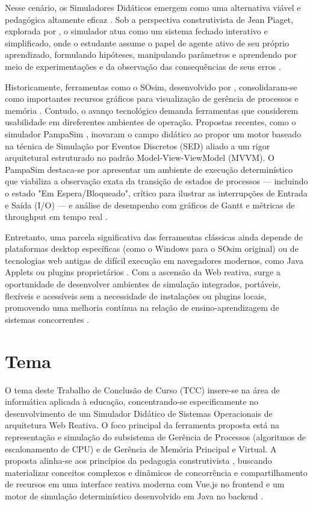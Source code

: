 Nesse cenário, os Simuladores Didáticos emergem como uma alternativa viável e pedagógica altamente eficaz \cite{maziero2002reflexoes}. Sob a perspectiva construtivista de Jean Piaget, explorada por , o simulador atua como um sistema fechado interativo e simplificado, onde o estudante assume o papel de agente ativo de seu próprio aprendizado, formulando hipóteses, manipulando parâmetros e aprendendo por meio de experimentações e da observação das consequências de seus erros \cite{teixeira2001siso, maia2005constructivist}. 

Historicamente, ferramentas como o SOsim, desenvolvido por , consolidaram-se como importantes recursos gráficos para visualização de gerência de processos e memória \cite{scamati2017esorv}. Contudo, o avanço tecnológico demanda ferramentas que considerem usabilidade em direferentes ambientes de operação. Propostas recentes, como o simulador PampaSim \cite{dutra2026pampasim}, inovaram o campo didático ao propor um motor baseado na técnica de Simulação por Eventos Discretos (SED) aliado a um rigor arquitetural estruturado no padrão Model-View-ViewModel (MVVM). O PampaSim destaca-se por apresentar um ambiente de execução determinístico que viabiliza a observação exata da transição de estados de processos --- incluindo o estado "Em Espera/Bloqueado", crítico para ilustrar as interrupções de Entrada e Saída (I/O) --- e análise de desempenho com gráficos de Gantt e métricas de throughput em tempo real \cite{dutra2026pampasim}.

Entretanto, uma parcela significativa das ferramentas clássicas ainda depende de plataformas desktop específicas (como o Windows para o SOsim original) ou de tecnologias web antigas de difícil execução em navegadores modernos, como Java Applets ou plugins proprietários \cite{reis2009tbcso}. Com a ascensão da Web reativa, surge a oportunidade de desenvolver ambientes de simulação integrados, portáveis, flexíveis e acessíveis sem a necessidade de instalações ou plugins locais, promovendo uma melhoria contínua na relação de ensino-aprendizagem de sistemas concorrentes \cite{moraes2010simulador, dutra2026pampasim}.

\section{Tema}
O tema deste Trabalho de Conclusão de Curso (TCC) insere-se na área de informática aplicada à educação, concentrando-se especificamente no desenvolvimento de um Simulador Didático de Sistemas Operacionais de arquitetura Web Reativa. O foco principal da ferramenta proposta está na representação e simulação do subsistema de Gerência de Processos (algoritmos de escalonamento de CPU) e de Gerência de Memória Principal e Virtual. A proposta alinha-se aos princípios da pedagogia construtivista \cite{machado2004framework}, buscando materializar conceitos complexos e dinâmicos de concorrência e compartilhamento de recursos em uma interface reativa moderna com Vue.js no frontend e um motor de simulação determinístico desenvolvido em Java no backend \cite{moraes2010simulador, dutra2026pampasim}.

